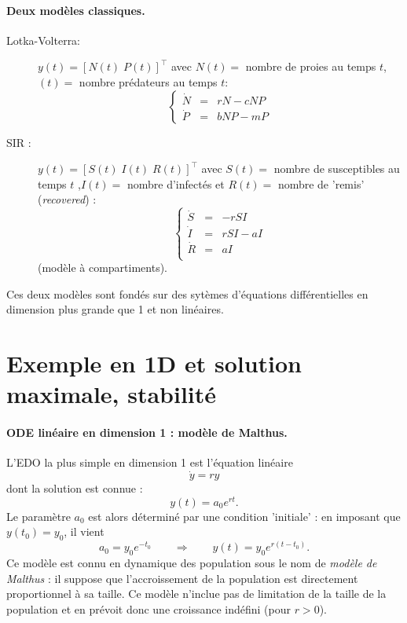 \paragraph*{Deux modèles classiques.}
\begin{description}
 \item[Lotka-Volterra:] $y(t) = [N(t) \; P(t)]^\top$ avec $N(t) =$ nombre de proies au temps $t$, $(t) = $ nombre prédateurs au temps $t$:
 $$
 \left\{ \begin{array}{rcl} 
  \dot N & = & r N - c N P \\
  \dot P & = & b N P  - m P
 \end{array} \right.
 $$
 \item[SIR :] $y(t) = [S(t) \; I(t) \; R(t)]^\top$ avec $S(t) =$ nombre de susceptibles au temps $t$ ,$I(t) =$ nombre d'infectés et $R(t) =$ nombre de 'remis' ({\em recovered}) :
 $$
 \left\{ \begin{array}{rcl} 
  \dot S & = & - r S I \\
  \dot I & = & r S I - a I \\
  \dot R & = & a I \\
 \end{array} \right.
 $$
 (modèle à compartiments).
\end{description}

Ces deux modèles sont fondés sur des sytèmes d'équations différentielles en dimension plus grande que 1 et non linéaires.

\section{Exemple en 1D et solution maximale, stabilité} \label{sec:EquaDiff-1DsolMaximale}

\paragraph*{ODE linéaire en dimension 1 : modèle de Malthus.}
L'EDO la plus simple en dimension 1 est l'équation linéaire
$$
\dot y = r y
$$
dont la solution est connue : 
$$
y(t) = a_0 e^{rt}.
$$
Le paramètre $a_0$ est alors déterminé par une condition 'initiale' : en imposant que $y(t_0) = y_0$, il vient
$$
a_0 = y_0 e^{-t_0} 
\qquad \Rightarrow \qquad
y(t) = y_0 e^{r(t-t_0)}.
$$
Ce modèle est connu en dynamique des population sous le nom de {\em modèle de Malthus} : il suppose que l'accroissement de la population est directement proportionnel à sa taille. Ce modèle n'inclue pas de limitation de la taille de la population et en prévoit donc une croissance indéfini (pour $r > 0$).


